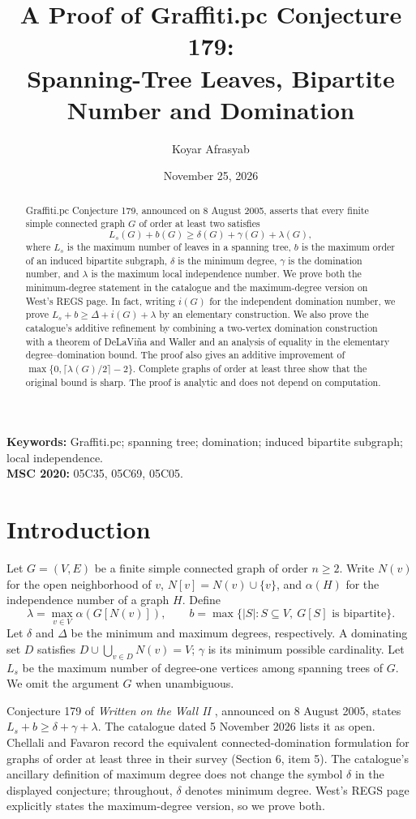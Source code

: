 \documentclass[11pt,a4paper]{article}
\title{A Proof of Graffiti.pc Conjecture 179:\\ Spanning-Tree Leaves, Bipartite Number and Domination}
\author{Koyar Afrasyab}
\date{November 25, 2026}
\newcommand{\ls}{L_s}
\newcommand{\lam}{\lambda}
\begin{document}
\maketitle
\begin{abstract}
Graffiti.pc Conjecture 179, announced on 8 August 2005, asserts that every finite simple connected graph $G$ of order at least two satisfies
\[
\ls(G)+b(G)\ge \delta(G)+\gamma(G)+\lam(G),
\]
where $\ls$ is the maximum number of leaves in a spanning tree, $b$ is the maximum order of an induced bipartite subgraph, $\delta$ is the minimum degree, $\gamma$ is the domination number, and $\lam$ is the maximum local independence number. We prove both the minimum-degree statement in the catalogue and the maximum-degree version on West's REGS page. In fact, writing $i(G)$ for the independent domination number, we prove $\ls+b\ge\Delta+i(G)+\lam$ by an elementary construction. We also prove the catalogue's additive refinement by combining a two-vertex domination construction with a theorem of DeLaVi\~na and Waller and an analysis of equality in the elementary degree--domination bound. The proof also gives an additive improvement of $\max\{0,\lceil\lam(G)/2\rceil-2\}$. Complete graphs of order at least three show that the original bound is sharp. The proof is analytic and does not depend on computation.
\end{abstract}
\noindent\textbf{Keywords:} Graffiti.pc; spanning tree; domination; induced bipartite subgraph; local independence.\\
\textbf{MSC 2020:} 05C35, 05C69, 05C05.
\section{Introduction}
Let $G=(V,E)$ be a finite simple connected graph of order $n\ge2$. Write $N(v)$ for the open neighborhood of $v$, $N[v]=N(v)\cup\{v\}$, and $\alpha(H)$ for the independence number of a graph $H$. Define
\[
\lam=\max_{v\in V}\alpha(G[N(v)]),\qquad
b=\max\{|S|:S\subseteq V,\ G[S]\text{ is bipartite}\}.
\]
Let $\delta$ and $\Delta$ be the minimum and maximum degrees, respectively. A dominating set $D$ satisfies $D\cup\bigcup_{v\in D}N(v)=V$; $\gamma$ is its minimum possible cardinality. Let $\ls$ be the maximum number of degree-one vertices among spanning trees of $G$. We omit the argument $G$ when unambiguous.

Conjecture 179 of \emph{Written on the Wall II} \cite{wow}, announced on 8 August 2005, states $\ls+b\ge\delta+\gamma+\lam$. The catalogue dated 5 November 2026 lists it as open. Chellali and Favaron \cite{cf} record the equivalent connected-domination formulation for graphs of order at least three in their survey (Section 6, item 5). The catalogue's ancillary definition of maximum degree does not change the symbol $\delta$ in the displayed conjecture; throughout, $\delta$ denotes minimum degree. West's REGS page \cite{west} explicitly states the maximum-degree version, so we prove both.
\end{document}

